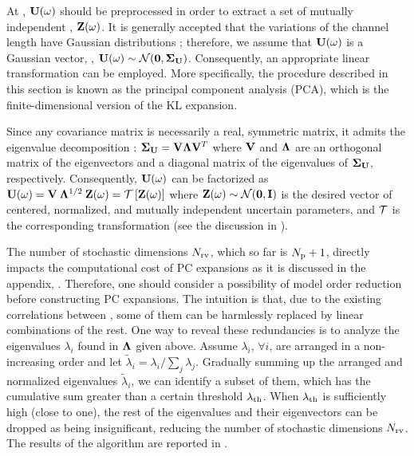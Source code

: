 At , $\mathbf{U}(\omega)$ should be preprocessed in order to extract a set of mutually independent \rvs, $\mathbf{Z}(\omega)$. It is generally accepted that the variations of the channel length have Gaussian distributions \cite{juan2011, juan2012, srivastava2010}; therefore, we assume that $\mathbf{U}(\omega)$ is a Gaussian vector, \ie, $\vU(\o) \sim \normal(\vZero, \mCov_\vU)$. Consequently, an appropriate linear transformation can be employed. More specifically, the procedure described in this section is known as the principal component analysis (PCA), which is the finite-dimensional version of the KL expansion.

Since any covariance matrix is necessarily a real, symmetric matrix, it admits the eigenvalue decomposition \cite{press2007}: $\mCov_\vU = \m{V} \m{\Lambda} \m{V}^T$ where $\m{V}$ and $\m{\Lambda}$ are an orthogonal matrix of the eigenvectors and a diagonal matrix of the eigenvalues of $\mCov_\vU$, respectively. Consequently, $\mathbf{U}(\omega)$ can be factorized as $\vU(\o) = \m{V} \: \m{\Lambda}^{1/2} \: \vZ(\o) = \oTransform{\vZ(\o)}$ where $\vZ(\o) \sim \normal(\vZero, \mI)$ is the desired vector of centered, normalized, and mutually independent uncertain parameters, and $\oTransform$ is the corresponding transformation (see the discussion in ).

The number of stochastic dimensions ${N_\text{rv}}$, which so far is ${N_\text{p}} + 1$, directly impacts the computational cost of PC expansions as it is discussed in the appendix, . Therefore, one should consider a possibility of model order reduction before constructing PC expansions. The intuition is that, due to the existing correlations between \rvs, some of them can be harmlessly replaced by linear combinations of the rest. One way to reveal these redundancies is to analyze the eigenvalues $\lambda_i$ found in $\m{\Lambda}$ given above. Assume $\lambda_i$, $\forall i$, are arranged in a non-increasing order and let $\tilde{\lambda}_i = \lambda_i / \sum_j \lambda_j$. Gradually summing up the arranged and normalized eigenvalues $\tilde{\lambda}_i$, we can identify a subset of them, which has the cumulative sum greater than a certain threshold $\lambda_\text{th}$. When $\lambda_\text{th}$ is sufficiently high (close to one), the rest of the eigenvalues and their eigenvectors can be dropped as being insignificant, reducing the number of stochastic dimensions ${N_\text{rv}}$. The results of the algorithm are reported in .
